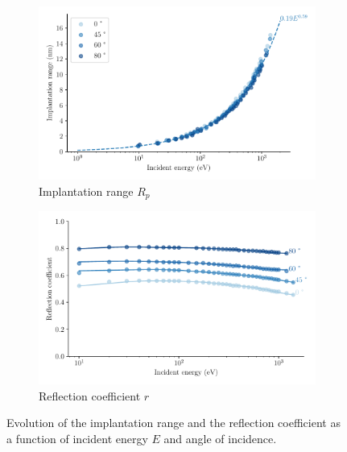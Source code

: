 

\begin{figure}[h]
    \centering
    \begin{subfigure}{0.5\linewidth}
        \includegraphics[width=\linewidth]{Figures/divertor/implantation_range.pdf}
        \caption{Implantation range $R_p$}
        \label{fig: implantation range vs energy}
    \end{subfigure}%
    \begin{subfigure}{0.5\linewidth}                          
        \includegraphics[width=\linewidth]{Figures/divertor/reflection_coeff.pdf}
        \caption{Reflection coefficient $r$}
        \label{fig: reflection coeff vs energy}
    \end{subfigure}
    \caption{Evolution of the implantation range and the reflection coefficient as a function of incident energy $E$ and angle of incidence.}
\end{figure}

